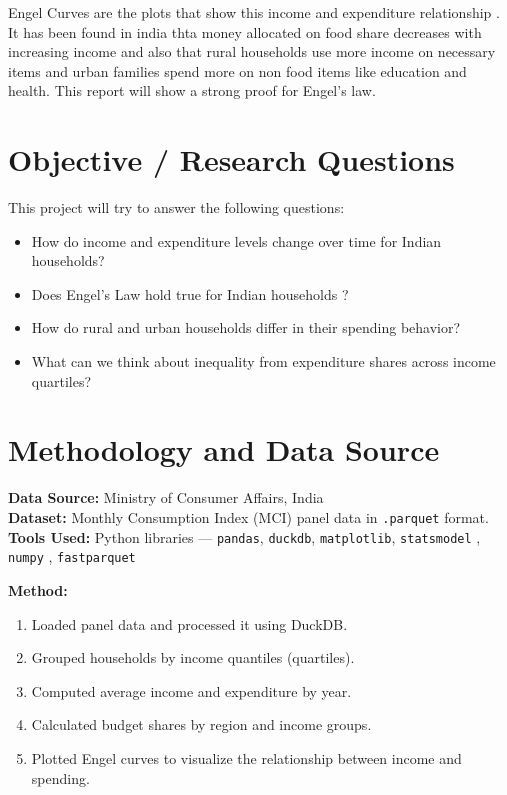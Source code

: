 \documentclass[12pt]{article}
\begin{document}
Engel Curves are the plots that show this income and expenditure relationship . It has been found in india thta money allocated on food share decreases with increasing income and also that rural households use more income on necessary items and urban families spend more on non food items like education and health.
This report will show a strong proof for Engel's law.

\section{Objective / Research Questions}
This project will try to answer the following questions:
\begin{itemize}
    \item How do income and expenditure levels change over time for Indian households?
    \item Does Engel’s Law hold true for Indian households ?
    \item How do rural and urban households differ in their spending behavior?
    \item What can we think about inequality from expenditure shares across income quartiles?
\end{itemize}

\section{Methodology and Data Source}
\textbf{Data Source:} Ministry of Consumer Affairs, India \\
\textbf{Dataset:} Monthly Consumption Index (MCI) panel data in \texttt{.parquet} format.\\
\textbf{Tools Used:} Python libraries — \texttt{pandas}, \texttt{duckdb}, \texttt{matplotlib}, \texttt{statsmodel} , \texttt{numpy} , \texttt{fastparquet}

\textbf{Method:}
\begin{enumerate}
    \item Loaded panel data and processed it using DuckDB.
    \item Grouped households by income quantiles (quartiles).
    \item Computed average income and expenditure by year.
    \item Calculated budget shares by region and income groups.
    \item Plotted Engel curves to visualize the relationship between income and spending.
\end{enumerate}
\end{document}
